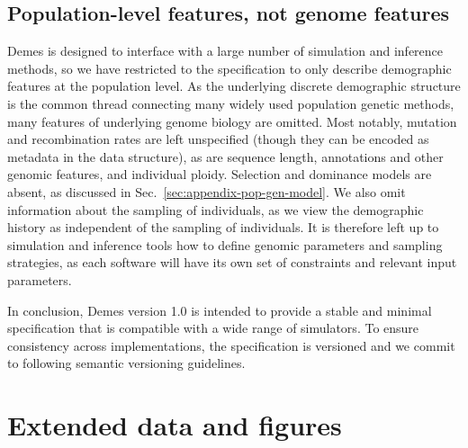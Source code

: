 \documentclass[11pt]{article}
\begin{document}
\subsection{Population-level features, not genome features}
\label{sec:appendix-features}

Demes is designed to interface with a large number of simulation and inference
methods, so we have restricted to the specification to only describe
demographic features at the population level. As the underlying discrete
demographic structure is the common thread connecting many widely used
population genetic methods, many features of underlying genome biology are
omitted. Most notably, mutation and recombination rates are left unspecified
(though they can be encoded as metadata in the data structure), as are
sequence length, annotations and other genomic features, and individual ploidy.
Selection and dominance models are absent, as discussed in
Sec.~\ref{sec:appendix-pop-gen-model}.
We also omit information about the sampling of individuals, as we view
the demographic history as independent of the sampling of individuals.
It is therefore left up to simulation and inference tools how to define
genomic parameters and sampling strategies, as each software will have its
own set of constraints and relevant input parameters.

In conclusion,
Demes version 1.0 is intended to provide a stable and minimal specification
that is compatible with a wide range of simulators. To ensure consistency
across implementations, the specification is versioned and we commit to
following semantic versioning guidelines.

\section{Extended data and figures}
\label{sec:appendix-figures}
\end{document}
